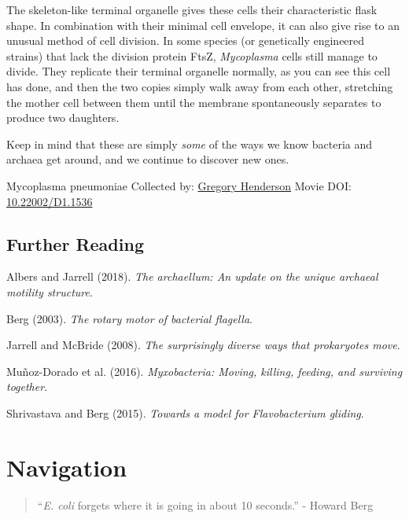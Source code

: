 \documentclass[]{tufte-book}
\begin{document}
The skeleton-like terminal organelle gives these cells their characteristic flask shape. In combination with their minimal cell envelope, it can also give rise to an unusual method of cell division. In some species (or genetically engineered strains) that lack the division protein FtsZ, \emph{Mycoplasma} cells still manage to divide. They replicate their terminal organelle normally, as you can see this cell has done, and then the two copies simply walk away from each other, stretching the mother cell between them until the membrane spontaneously separates to produce two daughters.

Keep in mind that these are simply \emph{some} of the ways we know bacteria and archaea get around, and we continue to discover new ones.



\hypertarget{htmlwidget-b1f6ed613e2744c59577}{}

\label{fig:6-12}Mycoplasma pneumoniae Collected by: \protect\hyperlink{gregory_henderson}{Gregory Henderson} Movie DOI: \href{https://doi.org/10.22002/D1.1536}{10.22002/D1.1536}

\hypertarget{further-reading-5}{%
\section{Further Reading}\label{further-reading-5}}

Albers and Jarrell (2018). \emph{The archaellum: An update on the unique archaeal motility structure}.\citep{albers2018}

Berg (2003). \emph{The rotary motor of bacterial flagella}.\citep{berg2003}

Jarrell and McBride (2008). \emph{The surprisingly diverse ways that prokaryotes move}.\citep{jarrell2008}

Muñoz-Dorado et al. (2016). \emph{Myxobacteria: Moving, killing, feeding, and surviving together}.\citep{munoz-dorado2016}

Shrivastava and Berg (2015). \emph{Towards a model for Flavobacterium gliding}.\citep{shrivastava2015}

\hypertarget{navigation}{%
\chapter{Navigation}\label{navigation}}

\begin{quote}
``\emph{E. coli} forgets where it is going in about 10 seconds.''
- Howard Berg \citep{berg1988}
\end{quote}
\end{document}
